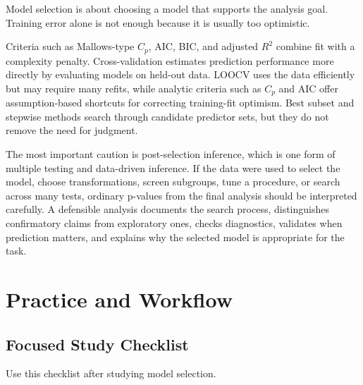 Model selection is about choosing a model that supports the analysis goal.  Training error alone is not enough because it is usually too optimistic.

Criteria such as Mallows-type \(C_p\), AIC, BIC, and adjusted \(R^2\) combine fit with a complexity penalty.  Cross-validation estimates prediction performance more directly by evaluating models on held-out data.  LOOCV uses the data efficiently but may require many refits, while analytic criteria such as \(C_p\) and AIC offer assumption-based shortcuts for correcting training-fit optimism.  Best subset and stepwise methods search through candidate predictor sets, but they do not remove the need for judgment.

The most important caution is post-selection inference, which is one form of multiple testing and data-driven inference.  If the data were used to select the model, choose transformations, screen subgroups, tune a procedure, or search across many tests, ordinary p-values from the final analysis should be interpreted carefully.  A defensible analysis documents the search process, distinguishes confirmatory claims from exploratory ones, checks diagnostics, validates when prediction matters, and explains why the selected model is appropriate for the task.

\section{Practice and Workflow}

\subsection*{Focused Study Checklist}

Use this checklist after studying model selection.


